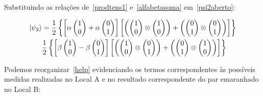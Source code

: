 Substituindo as relações de~\eqref{prodtens1} e~\eqref{alfabetasoma} em~\eqref{psi2aberto}:


\begin{align}\label{help}
\ket{\psi_2} &= \frac{1}{2}\left\{\left[\alpha\begin{pmatrix}
1 \\
0
\end{pmatrix}+\alpha\begin{pmatrix}
0 \\
1
\end{pmatrix}\right]\left[\left(\begin{pmatrix}
1 \\
0
\end{pmatrix} \otimes \begin{pmatrix}
1 \\
0
\end{pmatrix}\right) + \left(\begin{pmatrix}
0 \\
1
\end{pmatrix} \otimes \begin{pmatrix}
0 \\
1
\end{pmatrix}\right)\right]\right\} \nonumber \\
&\frac{1}{2}\left\{\left[\beta\begin{pmatrix}
1 \\
0
\end{pmatrix}-\beta\begin{pmatrix}
0 \\
1
\end{pmatrix}\right]\left[\left(\begin{pmatrix}
1 \\
0
\end{pmatrix} \otimes \begin{pmatrix}
0 \\
1
\end{pmatrix}\right) + \left(\begin{pmatrix}
0 \\
1
\end{pmatrix} \otimes \begin{pmatrix}
1 \\
0
\end{pmatrix}\right)\right]\right\}
\end{align}

Podemos reorganizar~\eqref{help} evidenciando os termos correspondentes às possíveis medidas realizadas no Local A e no resultado correspondente do par emaranhado no Local B:

